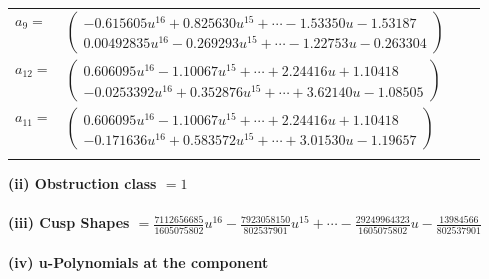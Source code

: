 \documentclass[1p]{elsarticle_modified}
\theoremstyle{definition}
\begin{document}
\begin{tabular}{m{7pt} m{180pt} m{7pt} m{180pt} }
\flushright $a_{9}=$&$\begin{pmatrix}-0.615605 u^{16}+0.825630 u^{15}+\cdots-1.53350 u-1.53187\\0.00492835 u^{16}-0.269293 u^{15}+\cdots-1.22753 u-0.263304\end{pmatrix}$ \\
\flushright $a_{12}=$&$\begin{pmatrix}0.606095 u^{16}-1.10067 u^{15}+\cdots+2.24416 u+1.10418\\-0.0253392 u^{16}+0.352876 u^{15}+\cdots+3.62140 u-1.08505\end{pmatrix}$ \\
\flushright $a_{11}=$&$\begin{pmatrix}0.606095 u^{16}-1.10067 u^{15}+\cdots+2.24416 u+1.10418\\-0.171636 u^{16}+0.583572 u^{15}+\cdots+3.01530 u-1.19657\end{pmatrix}$\\&\end{tabular}
\flushleft \textbf{(ii) Obstruction class $= 1$}\\~\\
\flushleft \textbf{(iii) Cusp Shapes $= \frac{7112656685}{1605075802} u^{16}-\frac{7923058150}{802537901} u^{15}+\cdots-\frac{29249964323}{1605075802} u-\frac{13984566}{802537901}$}\\~\\
\newpage\renewcommand{\arraystretch}{1}
\flushleft \textbf{(iv) u-Polynomials at the component}\newline \\
\end{document}
